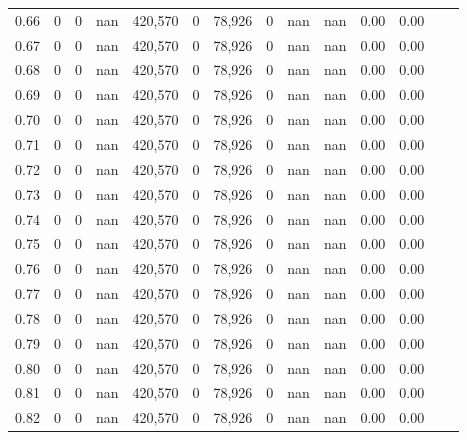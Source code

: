 \begin{tabular}{rrrrrrrrrrrrrr}
0.66 &       0 &       0 &     nan &  420,570 &        0 &  78,926 &       0 &   nan &   nan &  0.00 &      0.00 \\
0.67 &       0 &       0 &     nan &  420,570 &        0 &  78,926 &       0 &   nan &   nan &  0.00 &      0.00 \\
0.68 &       0 &       0 &     nan &  420,570 &        0 &  78,926 &       0 &   nan &   nan &  0.00 &      0.00 \\
0.69 &       0 &       0 &     nan &  420,570 &        0 &  78,926 &       0 &   nan &   nan &  0.00 &      0.00 \\
0.70 &       0 &       0 &     nan &  420,570 &        0 &  78,926 &       0 &   nan &   nan &  0.00 &      0.00 \\
0.71 &       0 &       0 &     nan &  420,570 &        0 &  78,926 &       0 &   nan &   nan &  0.00 &      0.00 \\
0.72 &       0 &       0 &     nan &  420,570 &        0 &  78,926 &       0 &   nan &   nan &  0.00 &      0.00 \\
0.73 &       0 &       0 &     nan &  420,570 &        0 &  78,926 &       0 &   nan &   nan &  0.00 &      0.00 \\
0.74 &       0 &       0 &     nan &  420,570 &        0 &  78,926 &       0 &   nan &   nan &  0.00 &      0.00 \\
0.75 &       0 &       0 &     nan &  420,570 &        0 &  78,926 &       0 &   nan &   nan &  0.00 &      0.00 \\
0.76 &       0 &       0 &     nan &  420,570 &        0 &  78,926 &       0 &   nan &   nan &  0.00 &      0.00 \\
0.77 &       0 &       0 &     nan &  420,570 &        0 &  78,926 &       0 &   nan &   nan &  0.00 &      0.00 \\
0.78 &       0 &       0 &     nan &  420,570 &        0 &  78,926 &       0 &   nan &   nan &  0.00 &      0.00 \\
0.79 &       0 &       0 &     nan &  420,570 &        0 &  78,926 &       0 &   nan &   nan &  0.00 &      0.00 \\
0.80 &       0 &       0 &     nan &  420,570 &        0 &  78,926 &       0 &   nan &   nan &  0.00 &      0.00 \\
0.81 &       0 &       0 &     nan &  420,570 &        0 &  78,926 &       0 &   nan &   nan &  0.00 &      0.00 \\
0.82 &       0 &       0 &     nan &  420,570 &        0 &  78,926 &       0 &   nan &   nan &  0.00 &      0.00 \\

\end{tabular}
